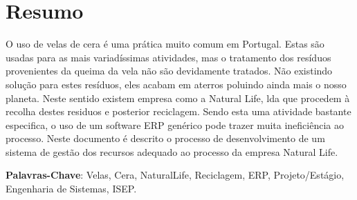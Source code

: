 \chapter*{Resumo}

O uso de velas de cera é uma prática muito comum em Portugal. Estas são usadas para as mais variadíssimas atividades, mas o tratamento dos resíduos provenientes da queima da vela não são devidamente tratados. Não existindo solução para estes resíduos, eles acabam em aterros poluindo ainda mais o nosso planeta. Neste sentido existem empresa como a Natural Life, lda que procedem à recolha destes residuos e posterior reciclagem. Sendo esta uma atividade bastante especifica, o uso de um software ERP genérico pode trazer muita ineficiência ao processo.
Neste documento é descrito o processo de desenvolvimento de um sistema de gestão dos recursos adequado ao processo da empresa Natural Life.

\textbf{Palavras-Chave}: Velas, Cera, NaturalLife, Reciclagem, ERP, Projeto/Estágio, Engenharia de Sistemas, ISEP.


